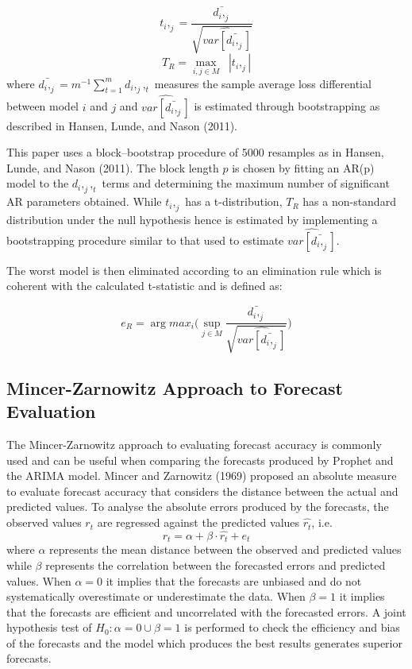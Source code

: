 \documentclass[12pt,a4paper]{article}
\numberwithin{equation}{section}
\numberwithin{figure}{section}
\numberwithin{table}{section}
\begin{document}
\[t_i,_j = \frac{\bar{d_i,_j}}{\sqrt{\hat{var[\bar{d_i,_j}]}}}\]
\vspace{1pt} \[ T_R = \max_{i,j\in M} \;\; |t_i,_j|\] where
\(\bar{d_i,_j} = m^{-1}\sum_{t=1}^{m}{d_i,_j,_t }\) measures the sample
average loss differential between model \(i\) and \(j\) and
\(\hat{var[\bar{d_i,_j}]}\) is estimated through bootstrapping as
described in Hansen, Lunde, and Nason (2011).

This paper uses a block--bootstrap procedure of 5000 resamples as in
Hansen, Lunde, and Nason (2011). The block length \(p\) is chosen by
fitting an AR(p) model to the \(d_i,_j,_t\) terms and determining the
maximum number of significant AR parameters obtained. While \(t_i,_j\)
has a t-distribution, \(T_R\) has a non-standard distribution under the
null hypothesis hence is estimated by implementing a bootstrapping
procedure similar to that used to estimate \(\hat{var[\bar{d_i,_j}]}\).

The worst model is then eliminated according to an elimination rule
which is coherent with the calculated t-statistic and is defined as:

\[e_R = \arg max_{i}\bigg(\sup_{j\in M}\frac{\bar{d_i,_j}}{\sqrt{\hat{var[\bar{d_i,_j}]}}}\bigg)\]

\subsection{Mincer-Zarnowitz Approach to Forecast
Evaluation}\label{mincer-zarnowitz-approach-to-forecast-evaluation}

The Mincer-Zarnowitz approach to evaluating forecast accuracy is
commonly used and can be useful when comparing the forecasts produced by
Prophet and the ARIMA model. Mincer and Zarnowitz (1969) proposed an
absolute measure to evaluate forecast accuracy that considers the
distance between the actual and predicted values. To analyse the
absolute errors produced by the forecasts, the observed values \(r_t\)
are regressed against the predicted values \(\hat{r_t}\), i.e.
\[r_t = \alpha + \beta\cdot\hat{r_t} + e_t\] where \(\alpha\) represents
the mean distance between the observed and predicted values while
\(\beta\) represents the correlation between the forecasted errors and
predicted values. When \(\alpha = 0\) it implies that the forecasts are
unbiased and do not systematically overestimate or underestimate the
data. When \(\beta = 1\) it implies that the forecasts are efficient and
uncorrelated with the forecasted errors. A joint hypothesis test of
\(H_0: \alpha = 0 \cup \beta = 1\) is performed to check the efficiency
and bias of the forecasts and the model which produces the best results
generates superior forecasts.
\end{document}
